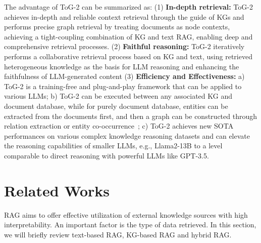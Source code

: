 \documentclass{article} %
\begin{document}
The advantage of ToG-2 can be summarized as:
 (1) \textbf{In-depth retrieval:} 
ToG-2 achieves in-depth and reliable context retrieval through the guide of KGs and performs precise graph retrieval by treating documents as node contexts, achieving a tight-coupling combination of KG and text RAG, enabling deep and comprehensive retrieval processes. 
(2) \textbf{Faithful 
 reasoning:} ToG-2 iteratively performs a collaborative retrieval process based on KG and text, using retrieved heterogeneous knowledge as the basis for LLM reasoning and enhancing the faithfulness of LLM-generated content
(3) \textbf{Efficiency and Effectiveness:} a) ToG-2 is a training-free and plug-and-play framework that can be applied to various LLMs; b) ToG-2 can be executed between any associated KG and document database, while for purely document database, entities can be extracted from the documents first, and then a graph can be constructed through relation extraction or entity co-occurrence~\citep{edge2024localglobalgraphrag}; c) ToG-2 achieves new SOTA performances on various complex knowledge reasoning datasets and can elevate the reasoning capabilities of smaller LLMs, e.g., Llama2-13B to a level comparable to direct reasoning with powerful LLMs like GPT-3.5.

\section{Related Works}
RAG aims to offer effective utilization of external knowledge sources with high interpretability. 
An important factor is the type of data retrieved. In this section, we will briefly review text-based RAG, KG-based RAG and hybrid RAG.
\end{document}
